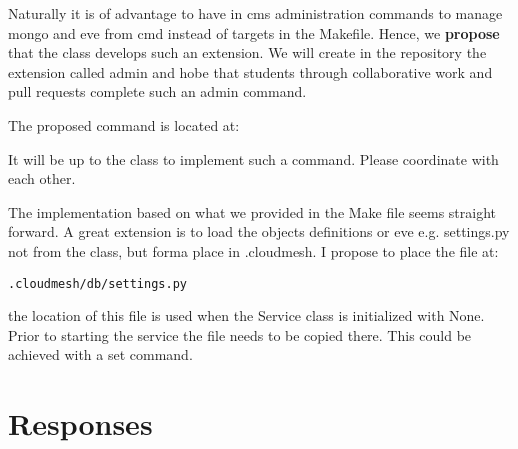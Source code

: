 Naturally it is of advantage to have in cms administration commands to
manage mongo and eve from cmd instead of targets in the Makefile. Hence,
we \textbf{propose} that the class develops such an extension. We will
create in the repository the extension called admin and hobe that
students through collaborative work and pull requests complete such an
admin command.

The proposed command is located at:



It will be up to the class to implement such a command. Please
coordinate with each other.

The implementation based on what we provided in the Make file seems
straight forward. A great extension is to load the objects definitions
or eve e.g. settings.py not from the class, but forma place in
.cloudmesh. I propose to place the file at:

\begin{lstlisting}
.cloudmesh/db/settings.py
\end{lstlisting}

the location of this file is used when the Service class is initialized
with None. Prior to starting the service the file needs to be copied
there. This could be achieved with a set command.

\section{Responses}



